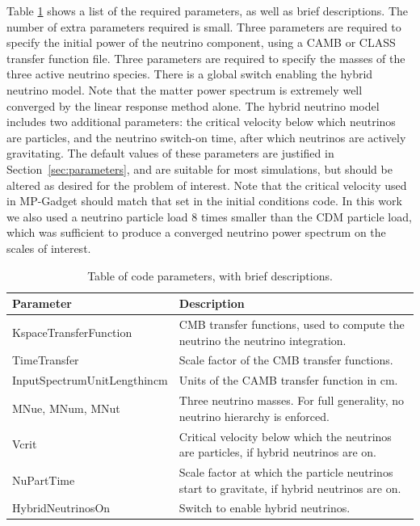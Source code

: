 \documentclass[useAMS, usenatbib]{mnras}
\begin{document}
Table \ref{tab:parameters} shows a list of the required parameters, as well as brief descriptions. The number of extra parameters required is small. Three parameters are required to specify the initial power of the neutrino component, using a CAMB or CLASS transfer function file. Three parameters are required to specify the masses of the three active neutrino species.
There is a global switch enabling the hybrid neutrino model. Note that the matter power spectrum is extremely well converged by the linear response method alone. The hybrid neutrino model includes two additional parameters: the critical velocity below which neutrinos are particles, and the neutrino switch-on time, after which neutrinos are actively gravitating. The default values of these parameters are justified in Section~\ref{sec:parameters}, and are suitable for most simulations, but should be altered as desired for the problem of interest.
Note that the critical velocity used in MP-Gadget should match that set in the initial conditions code. In this work we also used a neutrino particle load $8$ times smaller than the CDM particle load, which was sufficient to produce a converged neutrino power spectrum on the scales of interest.

\begin{table}
\begin{center}
\begin{tabular}{|l|l|}
\hline
    Parameter & Description \\
\hline
KspaceTransferFunction   & CMB transfer functions, used to compute the neutrino the neutrino integration. \\
TimeTransfer             & Scale factor of the CMB transfer functions. \\
InputSpectrumUnitLengthincm   & Units of the CAMB transfer function in cm. \\
MNue, MNum, MNut &  Three neutrino masses. For full generality, no neutrino  hierarchy is enforced. \\
Vcrit            & Critical velocity below which the neutrinos are particles, if hybrid neutrinos are on. \\
NuPartTime       & Scale factor at which the particle neutrinos start to gravitate, if hybrid neutrinos are on. \\
HybridNeutrinosOn       & Switch to enable hybrid neutrinos. \\
\hline
\end{tabular}
\end{center}
\caption{Table of code parameters, with brief descriptions.}
\label{tab:parameters}
\end{table}
\end{document}
